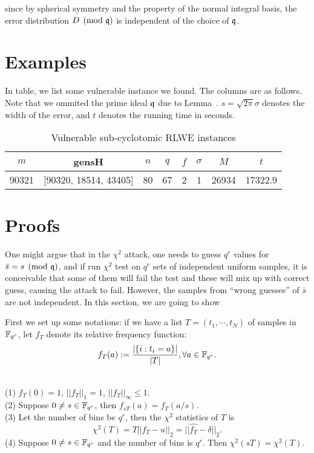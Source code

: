 \documentclass{amsart}
\begin{document}
{since by spherical symmetry and the property of the normal integral basis, the error distribution $D \pmod{\mathfrak{q}}$ is independent of the choice of $\mathfrak{q}$.


\section{Examples}

In table, we list some vulnerable instance we found. The columns are
as follows. Note that we ommited the prime ideal $\mathfrak{q}$ due to Lemma~.
$s = \sqrt{2 \pi} \sigma$ denotes the width of the error, and $t$ denotes the running time in seconds.

\begin{table}
\caption{Vulnerable sub-cyclotomic RLWE instances}
\begin{tabular}{c|c|c|c|c|c|c|c}
$m$ & gensH & $n$ & $q$ & $f$ & $\sigma$ & $M$ & $t$ \\ \hline
90321 & [90320, 18514, 43405] & 80 & 67 & 2 & 1 & 26934 & 17322.9 \\
\end{tabular}
\end{table}



\section{Proofs}


\iffalse
One might argue that in the $\chi^2$ attack, one needs to
guess $q^r$ values for $\bar{s} = s \pmod{\mathfrak{q}}$, and if run $\chi^2$
test on $q^r$ sets of independent uniform samples, it is conceivable that some of them will fail the test and these will mix up with correct guess, causing the attack to fail.
However, the samples from  ``wrong guesses'' of
$\bar{s}$ are not independent. In this section, we are going to show

First we set up some notations: if we have a list $T = (t_1, \cdots, t_N)$ of samples in $\mathbb{F}_{q^r}$, let $f_T$ denote its relative frequency function:
\[
    f_T(a) := \frac{|\{ i : t_i = a\}|}{|T|}, \forall a \in \mathbb{F}_{q^r}.
\]

\begin{Lemma} \hfill \\
(1) $f_T(0) = 1$, $||f_T||_1 = 1$, $||f_T||_{\infty} \leq 1$. \\
(2) Suppose $0 \neq s \in \mathbb{F}_{q^r}$, then $f_{sT}(a) = f_{T}(a/s)$. \\
(3) Let the number of bins be $q^r$, then the $\chi^2$
statistics of $T$ is
$$\chi^2(T) = T ||f_T - u||_2 = ||\hat{f_T} - \delta||_2.$$
(4) Suppose $0 \neq s \in \mathbb{F}_{q^r}$ and the number of bins is $q^r$. Then $\chi^2(sT) = \chi^2(T)$.
\end{Lemma}

}
\end{document}
